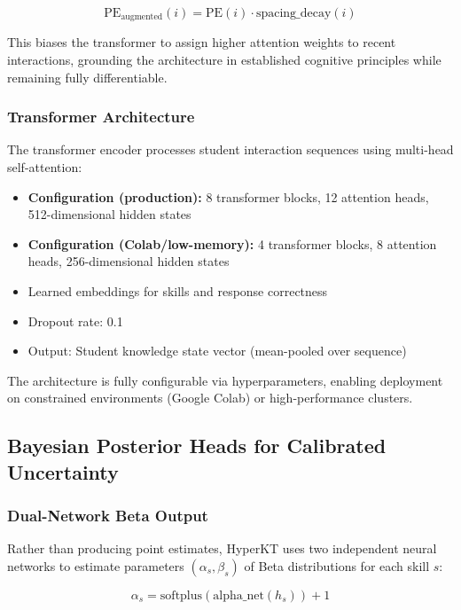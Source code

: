 \documentclass[10pt,twocolumn]{article}
\begin{document}
\begin{equation}
\text{PE}_{\text{augmented}}(i) = \text{PE}(i) \cdot \text{spacing\_decay}(i)
\end{equation}

This biases the transformer to assign higher attention weights to recent interactions, grounding the architecture in established cognitive principles while remaining fully differentiable.

\subsubsection{Transformer Architecture}
The transformer encoder processes student interaction sequences using multi-head self-attention:

\begin{itemize}
  \item \textbf{Configuration (production):} 8 transformer blocks, 12 attention heads, 512-dimensional hidden states
  \item \textbf{Configuration (Colab/low-memory):} 4 transformer blocks, 8 attention heads, 256-dimensional hidden states
  \item Learned embeddings for skills and response correctness
  \item Dropout rate: 0.1
  \item Output: Student knowledge state vector (mean-pooled over sequence)
\end{itemize}

The architecture is fully configurable via hyperparameters, enabling deployment on constrained environments (Google Colab) or high-performance clusters.

\subsection{Bayesian Posterior Heads for Calibrated Uncertainty}

\subsubsection{Dual-Network Beta Output}
Rather than producing point estimates, HyperKT uses two independent neural networks to estimate parameters $(\alpha_s, \beta_s)$ of Beta distributions for each skill $s$:

\begin{equation}
\alpha_s = \text{softplus}(\text{alpha\_net}(h_s)) + 1
\end{equation}
\end{document}
